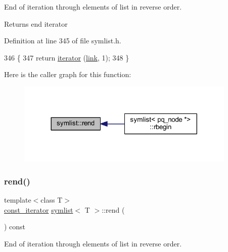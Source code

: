 End of iteration through elements of list in reverse order. 

\begin{DoxyReturn}{Returns}
end iterator 
\end{DoxyReturn}


Definition at line 345 of file symlist.\+h.


\begin{DoxyCode}
346     \{
347     \textcolor{keywordflow}{return} \mbox{\hyperlink{classsymlist_a66045fbe3d98975e5537092ede8b50df}{iterator}} (\mbox{\hyperlink{classsymlist_a8fa81a7f6d0bb986bb593776db582c90}{link}}, 1);
348     \}
\end{DoxyCode}
Here is the caller graph for this function\+:\nopagebreak
\begin{figure}[H]
\begin{center}
\leavevmode
\includegraphics[width=296pt]{classsymlist_a421fc482e62f257a9081e9e1c29d66a6_icgraph}
\end{center}
\end{figure}
\mbox{\label{classsymlist_a42379ebaa07ddb1160d785fec701712d}} 
\subsubsection{\texorpdfstring{rend()}{rend()}\hspace{0.1cm}{\footnotesize\ttfamily [2/2]}}
{\footnotesize\ttfamily template$<$class T$>$ \\
\mbox{\hyperlink{classsymlist_af15c0ca931299054f83d17a1580a5159}{const\+\_\+iterator}} \mbox{\hyperlink{classsymlist}{symlist}}$<$ T $>$\+::rend (\begin{DoxyParamCaption}{ }\end{DoxyParamCaption}) const\hspace{0.3cm}{\ttfamily [inline]}}



End of iteration through elements of list in reverse order. 

